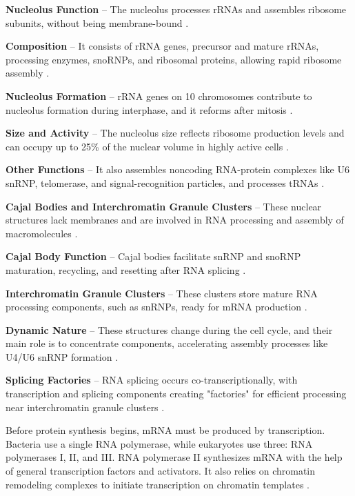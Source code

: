 \textbf{Nucleolus Function} – The nucleolus processes rRNAs and assembles ribosome subunits, without being membrane-bound \cite*{L1-Chapter6}.

\textbf{Composition} – It consists of rRNA genes, precursor and mature rRNAs, processing enzymes, snoRNPs, and ribosomal proteins, allowing rapid ribosome assembly \cite*{L1-Chapter6}.

\textbf{Nucleolus Formation} – rRNA genes on 10 chromosomes contribute to nucleolus formation during interphase, and it reforms after mitosis \cite*{L1-Chapter6}.

\textbf{Size and Activity} – The nucleolus size reflects ribosome production levels and can occupy up to 25\% of the nuclear volume in highly active cells \cite*{L1-Chapter6}.

\textbf{Other Functions} – It also assembles noncoding RNA-protein complexes like U6 snRNP, telomerase, and signal-recognition particles, and processes tRNAs \cite*{L1-Chapter6}.

\textbf{Cajal Bodies and Interchromatin Granule Clusters} – These nuclear structures lack membranes and are involved in RNA processing and assembly of macromolecules \cite*{L1-Chapter6}.

\textbf{Cajal Body Function} – Cajal bodies facilitate snRNP and snoRNP maturation, recycling, and resetting after RNA splicing \cite*{L1-Chapter6}.

\textbf{Interchromatin Granule Clusters} – These clusters store mature RNA processing components, such as snRNPs, ready for mRNA production \cite*{L1-Chapter6}.

\textbf{Dynamic Nature} – These structures change during the cell cycle, and their main role is to concentrate components, accelerating assembly processes like U4/U6 snRNP formation \cite*{L1-Chapter6}.

\textbf{Splicing Factories} – RNA splicing occurs co-transcriptionally, with transcription and splicing components creating "factories" for efficient processing near interchromatin granule clusters \cite*{L1-Chapter6}.

Before protein synthesis begins, mRNA must be produced by transcription. Bacteria use a single RNA polymerase, while eukaryotes use three: RNA polymerases I, II, and III. RNA polymerase II synthesizes mRNA with the help of general transcription factors and activators. It also relies on chromatin remodeling complexes to initiate transcription on chromatin templates \cite*{L1-Chapter6}.

